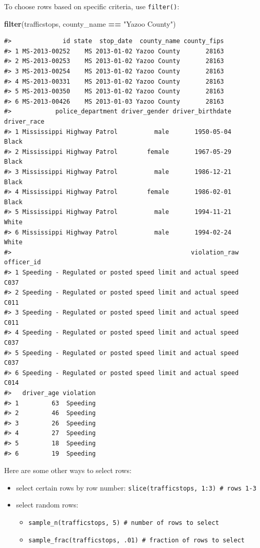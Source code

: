 \documentclass[]{book}
\newenvironment{Shaded}{\begin{snugshade}}{\end{snugshade}}
\newcommand{\KeywordTok}[1]{\textcolor[rgb]{0.13,0.29,0.53}{\textbf{#1}}}
\newcommand{\NormalTok}[1]{#1}
\newcommand{\OperatorTok}[1]{\textcolor[rgb]{0.81,0.36,0.00}{\textbf{#1}}}
\newcommand{\StringTok}[1]{\textcolor[rgb]{0.31,0.60,0.02}{#1}}
\providecommand{\tightlist}{%
  \setlength{\itemsep}{0pt}\setlength{\parskip}{0pt}}
\begin{document}
To choose rows based on specific criteria, use \texttt{filter()}:

\begin{Shaded}
\begin{Highlighting}[]
\KeywordTok{filter}\NormalTok{(trafficstops, county_name }\OperatorTok{==}\StringTok{ "Yazoo County"}\NormalTok{)}
\end{Highlighting}
\end{Shaded}

\begin{verbatim}
#>              id state  stop_date  county_name county_fips
#> 1 MS-2013-00252    MS 2013-01-02 Yazoo County       28163
#> 2 MS-2013-00253    MS 2013-01-02 Yazoo County       28163
#> 3 MS-2013-00254    MS 2013-01-02 Yazoo County       28163
#> 4 MS-2013-00331    MS 2013-01-02 Yazoo County       28163
#> 5 MS-2013-00350    MS 2013-01-02 Yazoo County       28163
#> 6 MS-2013-00426    MS 2013-01-03 Yazoo County       28163
#>            police_department driver_gender driver_birthdate driver_race
#> 1 Mississippi Highway Patrol          male       1950-05-04       Black
#> 2 Mississippi Highway Patrol        female       1967-05-29       Black
#> 3 Mississippi Highway Patrol          male       1986-12-21       Black
#> 4 Mississippi Highway Patrol        female       1986-02-01       Black
#> 5 Mississippi Highway Patrol          male       1994-11-21       White
#> 6 Mississippi Highway Patrol          male       1994-02-24       White
#>                                                 violation_raw officer_id
#> 1 Speeding - Regulated or posted speed limit and actual speed       C037
#> 2 Speeding - Regulated or posted speed limit and actual speed       C011
#> 3 Speeding - Regulated or posted speed limit and actual speed       C011
#> 4 Speeding - Regulated or posted speed limit and actual speed       C037
#> 5 Speeding - Regulated or posted speed limit and actual speed       C037
#> 6 Speeding - Regulated or posted speed limit and actual speed       C014
#>   driver_age violation
#> 1         63  Speeding
#> 2         46  Speeding
#> 3         26  Speeding
#> 4         27  Speeding
#> 5         18  Speeding
#> 6         19  Speeding
\end{verbatim}

Here are some other ways to select rows:

\begin{itemize}
\tightlist
\item
  select certain rows by row number: \texttt{slice(trafficstops,\ 1:3)\ \#\ rows\ 1-3}
\item
  select random rows:

  \begin{itemize}
  \tightlist
  \item
    \texttt{sample\_n(trafficstops,\ 5)\ \#\ number\ of\ rows\ to\ select}
  \item
    \texttt{sample\_frac(trafficstops,\ .01)\ \#\ fraction\ of\ rows\ to\ select}
  \end{itemize}
\end{itemize}
\end{document}

